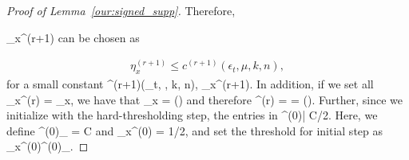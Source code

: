\documentclass{article}
\def\[#1\]{{$#1$}}
\def\b#1{{\mathbf{#1}}}
\begin{document}
\begin{proof}[Proof of Lemma~\ref{our:signed_supp}]
		Therefore, 
		
		\[\eta_x^{(r+1)}\] can be chosen as
	
	
		\begin{align*}
		\eta_x^{(r+1)}\leq c^{(r+1)}(\epsilon_t, \mu, k, n),
		
		\end{align*}
		for a small constant \[c^{(r+1)}(\epsilon_t, \mu, k, n)\], \[\eta_x^{(r+1)}\]. In addition, if we set all \[\eta_x^{(r)} = \eta_x\], we have that \[\eta_x = \tilde{\Omega}()\] and therefore \[\tau^{(r)} = \tau =  \tilde{\Omega}()\]. Further, since we initialize with the hard-thresholding step, the entries in \[|\b{x}^{(0)}| \geq C/2\]. Here, we define \[\tilde{\xi}^{(0)}_{\max} = C\] and \[\eta_x^{(0)} = 1/2\], and set the threshold for initial step as \[\eta_x^{(0)}\tilde{\xi}^{(0)}_{\max}\]. 
		
		





















































































\end{proof}
\end{document}
